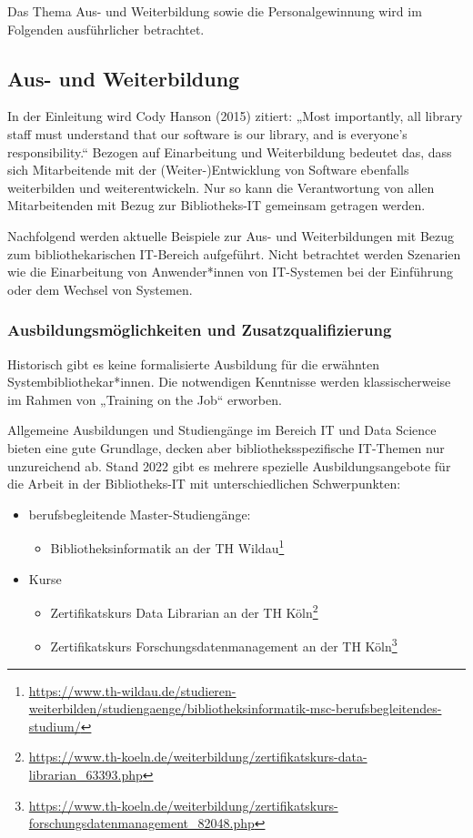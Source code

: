 \documentclass[
  11pt,
  letterpaper,
  DIV=11,
  twoside]{scrreprt}
\providecommand{\tightlist}{%
  \setlength{\itemsep}{0pt}\setlength{\parskip}{0pt}}\usepackage{longtable,booktabs,array}
\DeclareRobustCommand{\href}[2]{#2\footnote{\url{#1}}}
\begin{document}
Das Thema Aus- und Weiterbildung sowie die Personalgewinnung wird im
Folgenden ausführlicher betrachtet.

\subsection{Aus- und Weiterbildung}\label{aus--und-weiterbildung}

In der Einleitung wird Cody Hanson (2015) zitiert: „Most importantly,
all library staff must understand that our software is our library, and
is everyone's responsibility.`` Bezogen auf Einarbeitung und
Weiterbildung bedeutet das, dass sich Mitarbeitende mit der
(Weiter-)Entwicklung von Software ebenfalls weiterbilden und
weiterentwickeln. Nur so kann die Verantwortung von allen Mitarbeitenden
mit Bezug zur Bibliotheks-IT gemeinsam getragen werden.

Nachfolgend werden aktuelle Beispiele zur Aus- und Weiterbildungen mit
Bezug zum bibliothekarischen IT-Bereich aufgeführt. Nicht betrachtet
werden Szenarien wie die Einarbeitung von Anwender*innen von IT-Systemen
bei der Einführung oder dem Wechsel von Systemen.

\subsubsection{Ausbildungsmöglichkeiten und
Zusatzqualifizierung}\label{ausbildungsmuxf6glichkeiten-und-zusatzqualifizierung}

Historisch gibt es keine formalisierte Ausbildung für die erwähnten
Systembibliothekar*innen. Die notwendigen Kenntnisse werden
klassischerweise im Rahmen von „Training on the Job`` erworben.

Allgemeine Ausbildungen und Studiengänge im Bereich IT und Data Science
bieten eine gute Grundlage, decken aber bibliotheksspezifische IT-Themen
nur unzureichend ab. Stand 2022 gibt es mehrere spezielle
Ausbildungsangebote für die Arbeit in der Bibliotheks-IT mit
unterschiedlichen Schwerpunkten:

\begin{itemize}
\tightlist
\item
  berufsbegleitende Master-Studiengänge:

  \begin{itemize}
  \tightlist
  \item
    \href{https://www.th-wildau.de/studieren-weiterbilden/studiengaenge/bibliotheksinformatik-msc-berufsbegleitendes-studium/}{Bibliotheksinformatik
    an der TH Wildau}
  \end{itemize}
\item
  Kurse

  \begin{itemize}
  \tightlist
  \item
    \href{https://www.th-koeln.de/weiterbildung/zertifikatskurs-data-librarian_63393.php}{Zertifikatskurs
    Data Librarian an der TH Köln}
  \item
    \href{https://www.th-koeln.de/weiterbildung/zertifikatskurs-forschungsdatenmanagement_82048.php}{Zertifikatskurs
    Forschungsdatenmanagement an der TH Köln}
  \end{itemize}
\end{itemize}
\end{document}
